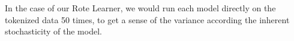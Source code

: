 In the case of our Rote Learner, we would run each model directly on the tokenized data 50 times, to get a sense of the variance according the inherent stochasticity of the model.









    
